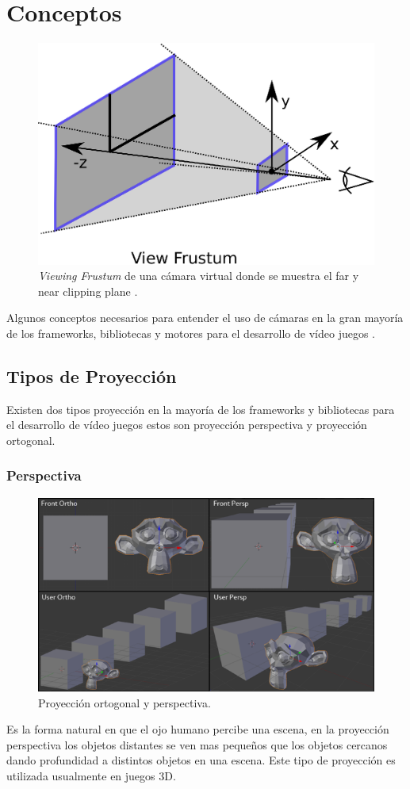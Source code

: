\section{Conceptos}
\begin{figure}
\includegraphics[width=\linewidth]{media/frustum.eps}
\caption{\emph{Viewing Frustum} de una cámara virtual donde se muestra el far y near clipping plane \cite{microsoft_frustum}.}
\label{fig:frustum}
\end{figure}
Algunos conceptos necesarios para entender el uso de cámaras en la gran mayoría de los frameworks, bibliotecas y motores para el desarrollo de vídeo juegos \cite{unity_camera}.
\subsection{Tipos de Proyección}
Existen dos tipos proyección en la mayoría de los frameworks y bibliotecas para el desarrollo de vídeo juegos estos son proyección perspectiva y proyección ortogonal.
\subsubsection{Perspectiva}
\setlength\intextsep{0pt}
\begin{figure}
\includegraphics[width=\linewidth]{media/projections.png}
\caption{Proyección ortogonal y perspectiva.}
\end{figure}
Es la forma natural en que el ojo humano percibe una escena, en la proyección perspectiva los objetos distantes se ven mas pequeños que los objetos cercanos dando profundidad a distintos objetos en una escena. Este tipo de proyección es utilizada usualmente en juegos 3D.
